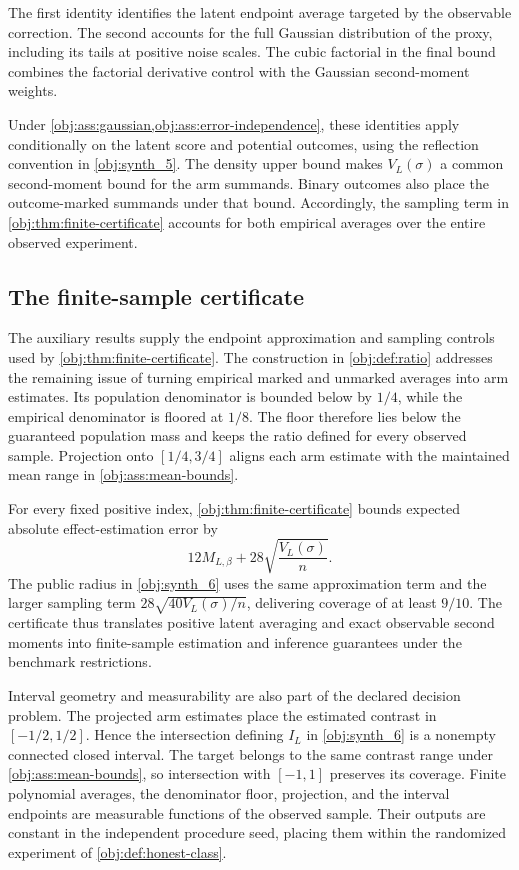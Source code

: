 \documentclass[11pt]{article}
\begin{document}
The first identity identifies the latent endpoint average targeted by the observable correction. The second accounts for the full Gaussian distribution of the proxy, including its tails at positive noise scales. The cubic factorial in the final bound combines the factorial derivative control with the Gaussian second-moment weights.

Under \cref{obj:ass:gaussian,obj:ass:error-independence}, these identities apply conditionally on the latent score and potential outcomes, using the reflection convention in \cref{obj:synth_5}. The density upper bound makes \(V_L(\sigma)\) a common second-moment bound for the arm summands. Binary outcomes also place the outcome-marked summands under that bound. Accordingly, the sampling term in \cref{obj:thm:finite-certificate} accounts for both empirical averages over the entire observed experiment.

\subsection{The finite-sample certificate}

The auxiliary results supply the endpoint approximation and sampling controls used by \cref{obj:thm:finite-certificate}. The construction in \cref{obj:def:ratio} addresses the remaining issue of turning empirical marked and unmarked averages into arm estimates. Its population denominator is bounded below by \(1/4\), while the empirical denominator is floored at \(1/8\). The floor therefore lies below the guaranteed population mass and keeps the ratio defined for every observed sample. Projection onto \([1/4,3/4]\) aligns each arm estimate with the maintained mean range in \cref{obj:ass:mean-bounds}.

For every fixed positive index, \cref{obj:thm:finite-certificate} bounds expected absolute effect-estimation error by
\[
12M_{L,\beta}+28\sqrt{\frac{V_L(\sigma)}{n}}.
\]
The public radius in \cref{obj:synth_6} uses the same approximation term and the larger sampling term \(28\sqrt{40V_L(\sigma)/n}\), delivering coverage of at least \(9/10\). The certificate thus translates positive latent averaging and exact observable second moments into finite-sample estimation and inference guarantees under the benchmark restrictions.

Interval geometry and measurability are also part of the declared decision problem. The projected arm estimates place the estimated contrast in \([-1/2,1/2]\). Hence the intersection defining \(I_L\) in \cref{obj:synth_6} is a nonempty connected closed interval. The target belongs to the same contrast range under \cref{obj:ass:mean-bounds}, so intersection with \([-1,1]\) preserves its coverage. Finite polynomial averages, the denominator floor, projection, and the interval endpoints are measurable functions of the observed sample. Their outputs are constant in the independent procedure seed, placing them within the randomized experiment of \cref{obj:def:honest-class}.
\end{document}
